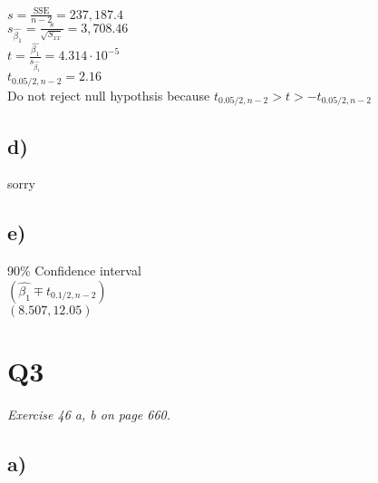 \documentclass[a4paper,11pt]{article}
\begin{document}
$s = \frac{\text{SSE}}{n - 2} = 237,187.4$\\

$s_{\hat{\beta_1}} = \frac{s}{\sqrt{S_{xx}}} = 3,708.46$ \\

$t = \frac{\hat{\beta_1}}{s_{\hat{\beta_1}}} = 4.314 \cdot 10^{-5}$\\

$t_{0.05/2,n-2} = 2.16$ \\

Do not reject null hypothsis because $t_{0.05/2,n-2} > t > - t_{0.05/2,n-2}$

\subsection*{d)}

sorry

\subsection*{e)}

90\% Confidence interval\\

$(\hat{\beta_1} \mp t_{0.1/2,n-2})$\\

$(8.507,12.05)$


\pagebreak
\section*{Q3}
\textit{Exercise 46 a, b on page 660.}


\subsection*{a)}
\end{document}
